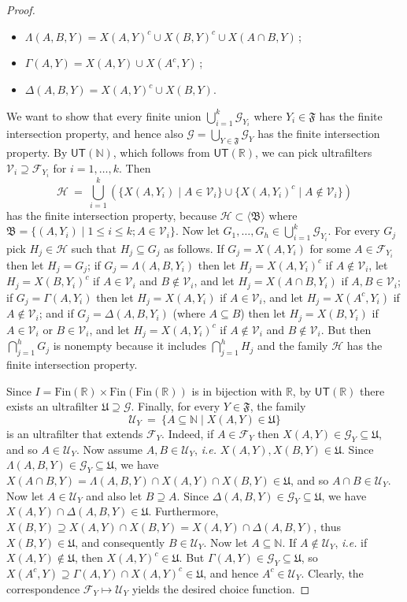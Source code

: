\documentclass{amsart}
\theoremstyle{definition}
\theoremstyle{remark}
\def\F{\mathscr{F}}
\def\G{\mathscr{G}}
\def\H{\mathscr{H}}
\def\U{\mathscr{U}}
\def\V{\mathscr{V}}
\def\BB{\mathfrak{B}}
\def\FF{\mathfrak{F}}
\def\UU{\mathfrak{U}}
\def\N{\mathbb{N}}
\def\R{\mathbb{R}}
\begin{document}
\begin{proof}
\begin{itemize}
\item
$\Lambda(A,B,Y)=X(A,Y)^c\cup X(B,Y)^c\cup X(A\cap B,Y)$\,;
\item
$\Gamma(A,Y)=X(A,Y)\cup X(A^c,Y)$\,;
\item
$\Delta(A,B,Y)=X(A,Y)^{c}\cup X(B,Y)$.
\end{itemize}
We want to show that every finite union
$\bigcup_{i=1}^k\G_{Y_i}$ where $Y_i\in\FF$
has the finite intersection
property, and hence also $\G=\bigcup_{Y\in\FF}\G_Y$
has the finite intersection property.
By $\textsf{UT}(\N)$, 
which follows from $\textsf{UT}(\R)$,
we can pick ultrafilters $\V_i\supseteq \F_{Y_i}$ for $i=1,\ldots,k$.
Then
$$\H\ =\ \bigcup_{i=1}^k\left(\{X(A,Y_i)\mid A\in\V_i\}\cup
\{X(A,Y_i)^c\mid A\notin\V_i\}\right)$$
has the finite intersection property, because
$\H\subset\langle\BB\rangle$
where $\BB=\{(A,Y_i)\mid 1\le i\le k;A\in \V_i\}$.
Now let $G_1,\ldots,G_h\in\bigcup_{i=1}^k\G_{Y_i}$.
For every $G_j$ pick
$H_j\in\H$ such that $H_j\subseteq G_j$ as follows.
If $G_j=X(A,Y_i)$ for some $A\in\F_{Y_i}$
then let $H_j=G_j$; if $G_j=\Lambda(A,B,Y_i)$ then
let $H_j=X(A,Y_i)^c$ if $A\notin\V_i$, 
let $H_j=X(B,Y_i)^c$
if $A\in\V_i$ and $B\notin\V_i$,
and let $H_j=X(A\cap B,Y_i)$ if $A,B\in\V_i$;
if $G_j=\Gamma(A,Y_i)$ then let
$H_j=X(A,Y_i)$ if $A\in\V_i$,
and let $H_j=X(A^c,Y_i)$ if $A\notin\V_i$;
and if $G_{j}=\Delta(A,B,Y_{i})$ (where $A\subseteq B$) then let $H_j=X(B,Y_{i})$ if
$A\in\V_{i}$ or $B\in\V_{i}$, and let $H_{j}=X(A,Y_{i})^{c}$ if
$A\not\in\V_{i}$ and $B\not\in\V_{i}$.
But then $\bigcap_{j=1}^h G_j$ is nonempty
because it includes $\bigcap_{j=1}^h H_j$
and the family $\H$ has the finite intersection property.

Since $I=\text{Fin}(\R)\times\text{Fin}(\text{Fin}(\R))$ is
in bijection with $\R$, by $\textsf{UT}(\R)$ there exists an 
ultrafilter $\UU\supseteq\G$. Finally, 
for every $Y\in\FF$, the family 
$$\U_Y\ =\ \{A\subseteq\N\mid
X(A,Y)\in\UU\}$$
is an ultrafilter that extends $\F_Y$.
Indeed, if $A\in\F_Y$ then $X(A,Y)\in\G_Y\subseteq\UU$,
and so $A\in\U_Y$. Now assume $A,B\in\U_Y$, \emph{i.e.}
$X(A,Y),X(B,Y)\in\UU$. 
Since $\Lambda(A,B,Y)\in\G_Y\subseteq\UU$, we have
$X(A\cap B,Y)=\Lambda(A,B,Y)\cap X(A,Y)\cap X(B,Y)\in\UU$,
and so $A\cap B\in\U_Y$. Now let $A\in\U_{Y}$ and also let $B\supseteq A$.
Since $\Delta(A,B,Y)\in\G_{Y}\subseteq\UU$, we have $X(A,Y)\cap\Delta(A,B,Y)\in\UU$.
Furthermore, $X(B,Y)\supseteq X(A,Y)\cap X(B,Y)=
X(A,Y)\cap\Delta(A,B,Y)$, thus $X(B,Y)\in\UU$, and consequently $B\in\U_{Y}$.
Now let $A\subseteq\N$. If $A\notin\U_Y$, \emph{i.e.} if
$X(A,Y)\notin\UU$, then
$X(A,Y)^c\in\UU$. But $\Gamma(A,Y)\in\G_Y\subseteq\UU$,
so $X(A^c,Y)\supseteq\Gamma(A,Y)\cap X(A,Y)^c\in\UU$,
and hence $A^c\in\U_Y$. Clearly, the correspondence $\F_Y\mapsto\U_Y$
yields the desired choice function.
\end{proof}
\end{document}

